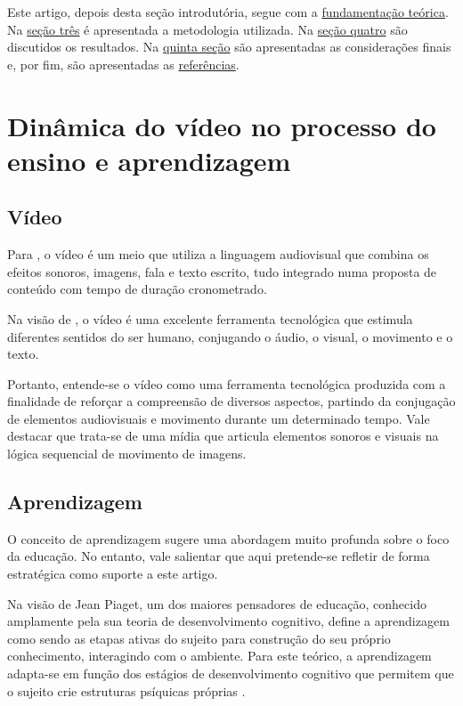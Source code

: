 \documentclass[portuguese]{textolivre}
\begin{document}
Este artigo, depois desta seção introdutória, segue com a \hyperref[sec-dois]{fundamentação teórica}. Na \hyperref[sec-tres]{seção três} é apresentada a metodologia utilizada. Na \hyperref[sec-quatro]{seção quatro} são discutidos os resultados. Na \hyperref[sec-cinco]{quinta seção} são apresentadas as considerações finais e, por fim, são apresentadas as \hyperref[sec-bib]{referências}.

\section{Dinâmica do vídeo no processo do ensino e aprendizagem}\label{sec-dois}

\subsection{Vídeo}

Para \textcite{deckert2010}, o vídeo é um meio que utiliza a linguagem audiovisual que combina os efeitos sonoros, imagens, fala e texto escrito, tudo integrado numa proposta de conteúdo com tempo de duração cronometrado.

Na visão de \textcite{pazzini2013}, o vídeo é uma excelente ferramenta tecnológica que estimula diferentes sentidos do ser humano, conjugando o áudio, o visual, o movimento e o texto.

Portanto, entende-se o vídeo como uma ferramenta tecnológica produzida com a finalidade de reforçar a compreensão de diversos aspectos, partindo da conjugação de elementos audiovisuais e movimento durante um determinado tempo. Vale destacar que trata-se de uma mídia que articula elementos sonoros e visuais na lógica sequencial de movimento de imagens.

\subsection{Aprendizagem}
O conceito de aprendizagem sugere uma abordagem muito profunda sobre o foco da educação. No entanto, vale salientar que aqui pretende-se refletir de forma estratégica como suporte a este artigo.

Na visão de Jean Piaget, um dos maiores pensadores de educação, conhecido amplamente pela sua teoria de desenvolvimento cognitivo, define a aprendizagem como sendo as etapas ativas do sujeito para construção do seu próprio conhecimento, interagindo com o ambiente. Para este teórico, a aprendizagem adapta-se em função dos estágios de desenvolvimento cognitivo que permitem que o sujeito crie estruturas psíquicas próprias \cite{piaget1994}.
\end{document}
